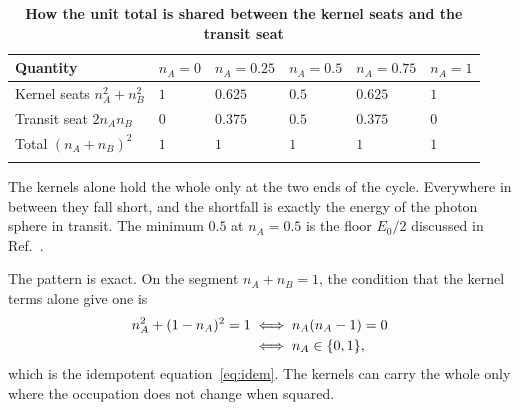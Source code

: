 \documentclass[%
 reprint, amsmath,amssymb, aps, prb, ]{revtex4-2}
\numberwithin{equation}{section}
\begin{document}
\begin{table}[t!]
\centering
\caption{\textbf{How the unit total is shared between the kernel seats and the transit seat}}
\label{tab:seats}
\renewcommand{\arraystretch}{1.4}
\begin{tabular}{p{4.3cm}p{2.0cm}p{2.0cm}p{2.0cm}p{2.0cm}p{2.0cm}}
\toprule
\textbf{Quantity} & $n_A=0$ & $n_A=0.25$ & $n_A=0.5$ & $n_A=0.75$ & $n_A=1$ \\
\midrule
Kernel seats $n_A^2+n_B^2$
& $1$
& $0.625$
& $0.5$
& $0.625$
& $1$ \\
\addlinespace[0.3cm]
Transit seat $2n_An_B$
& $0$
& $0.375$
& $0.5$
& $0.375$
& $0$ \\
\addlinespace[0.3cm]
Total $(n_A+n_B)^2$
& $1$
& $1$
& $1$
& $1$
& $1$ \\
\addlinespace[0.2cm]
\bottomrule
\end{tabular}
\vspace{0.2cm}
\begin{minipage}{0.95\textwidth}
\justifying\footnotesize
The kernels alone hold the whole only at the two ends of the cycle. Everywhere in between they fall short, and the shortfall is exactly the energy of the photon sphere in transit. The minimum $0.5$ at $n_A=0.5$ is the floor $E_0/2$ discussed in Ref.~\cite{ref:p46}.
\end{minipage}
\end{table}

The pattern is exact. On the segment $n_A+n_B=1$, the condition that the kernel terms alone give one is
\begin{align}
n_A^2+(1-n_A)^2=1
&\;\Longleftrightarrow\; n_A(n_A-1)=0
\notag\\
&\;\Longleftrightarrow\; n_A\in\{0,1\},
\label{eq:kernelonly}
\end{align}
which is the idempotent equation~\eqref{eq:idem}. The kernels can carry the whole only where the occupation does not change when squared.
\end{document}
